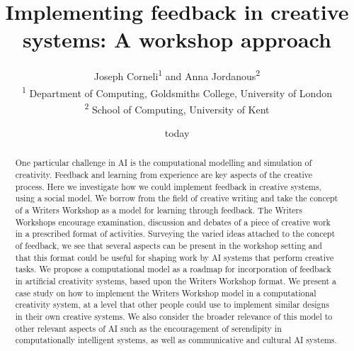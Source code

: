 \documentclass[letter]{article}
\begin{document}
\title{Implementing feedback in creative systems: A workshop approach}

\author{Joseph Corneli\textsuperscript{1} and Anna Jordanous\textsuperscript{2}\\
\textsuperscript{1} Department of Computing, Goldsmiths College, University of London\\
\textsuperscript{2} School of Computing, University of Kent}

\date{today}

\maketitle

\begin{abstract} 
One particular challenge in AI is the computational modelling and
simulation of creativity.  Feedback and learning from experience are
key aspects of the creative process.  Here we investigate how we could
implement feedback in creative systems, using a social model.
%
We borrow from the field of creative writing and take the concept of a
Writers Workshop as a model for learning through feedback.  The
Writers Workshops encourage examination, discussion and debates of a
piece of creative work in a prescribed format of activities.
%
Surveying the varied ideas attached to the concept of feedback, we see
that several aspects can be present in the workshop setting and that
this format could be useful for shaping work by AI systems that
perform creative tasks.  We propose a computational model as a roadmap
for incorporation of feedback in artificial creativity systems, based
upon the Writers Workshop format.
%
We present a case study on how to implement the Writers Workshop model
in a computational creativity system, at a level that other people
could use to implement similar designs in their own creative systems.
%
We also consider the broader relevance of this model to other relevant
aspects of AI such as the encouragement of serendipity in
computationally intelligent systems, as well as communicative and
cultural AI systems.

\end{abstract}




%









\end{document}
